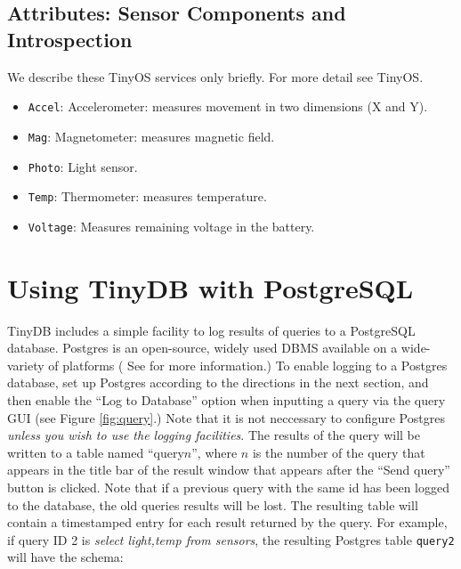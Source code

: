 \documentclass[11pt]{article}
\begin{document}
\subsection{Attributes: Sensor Components and Introspection}
\label{sec:devices}
We describe these TinyOS services only briefly.  For more detail see
TinyOS.
\begin{itemize}
\item {\tt Accel}: Accelerometer: measures movement in two dimensions
  (X and Y).
\item {\tt Mag}: Magnetometer: measures magnetic field.
\item {\tt Photo}: Light sensor.
\item {\tt Temp}: Thermometer: measures temperature.
\item {\tt Voltage}: Measures remaining voltage in the battery.
\end{itemize}

\section{Using TinyDB with PostgreSQL}\label{postgres}

TinyDB includes a simple facility to log results of queries to a PostgreSQL database.  Postgres
is an open-source, widely used DBMS available on a wide-variety of platforms ( 
See  for more information.)   To enable logging
to a Postgres database, set up Postgres according to the directions in the next section, and then
enable the ``Log to Database'' option when inputting a query via the query GUI (see Figure \ref{fig:query}.) Note that it
is not neccessary to configure Postgres {\it unless you wish to use the logging facilities}.
The results of the query will be written to a table named ``query$n$'', where $n$ is the number of the query
that appears in the title bar of the result window that appears after the ``Send query'' button is
clicked.  Note that if a previous query with the same id has been logged to the database, the old
queries results will be lost.  The resulting table will contain a timestamped entry for each result
returned by the query.  For example, if query ID 2 is {\it select light,temp from sensors}, the resulting
Postgres table {\tt query2} will have the schema:
\end{document}
